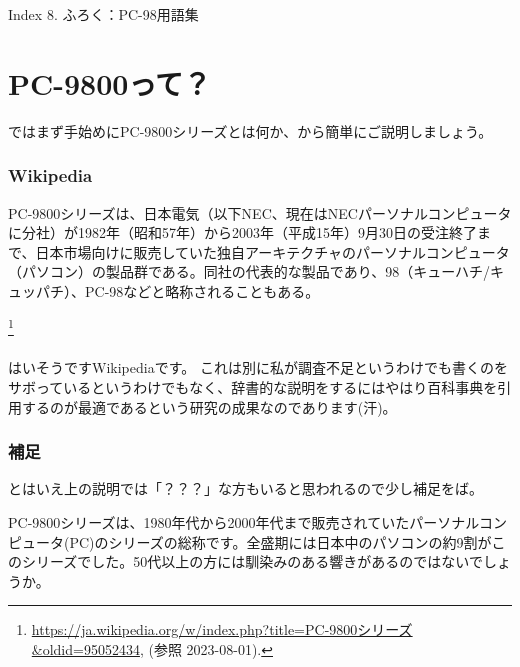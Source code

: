 \documentclass[b5paper,9pt,platex,dvipdfmx]{jsarticle}
\begin{document}
\begin{multicols}{3}
\begin{itembox}[l]{Index}
  8. ふろく：PC-98用語集
  \\
  \end{itembox}
\part{PC-9800って？}
ではまず手始めにPC-9800シリーズとは何か、から簡単にご説明しましょう。
\section[short]{Wikipedia}
\begin{screen}
PC-9800シリーズは、日本電気（以下NEC、現在はNECパーソナルコンピュータに分社）が1982年（昭和57年）から2003年（平成15年）9月30日の受注終了まで、日本市場向けに販売していた独自アーキテクチャのパーソナルコンピュータ（パソコン）の製品群である。同社の代表的な製品であり、98（キューハチ/キュッパチ）、PC-98などと略称されることもある。
\end{screen}
\footnote{\url{https://ja.wikipedia.org/w/index.php?title=PC-9800シリーズ&oldid=95052434}, (参照 2023-08-01).}
\\
\\
はいそうですWikipediaです。
これは別に私が調査不足というわけでも書くのをサボっているというわけでもなく、辞書的な説明をするにはやはり百科事典を引用するのが最適であるという研究の成果なのであります(汗)。
\section[short]{補足}
とはいえ上の説明では「？？？」な方もいると思われるので少し補足をば。

PC-9800シリーズは、1980年代から2000年代まで販売されていたパーソナルコンピュータ(PC)のシリーズの総称です。全盛期には日本中のパソコンの約9割がこのシリーズでした。50代以上の方には馴染みのある響きがあるのではないでしょうか。


\end{multicols}
\end{document}
